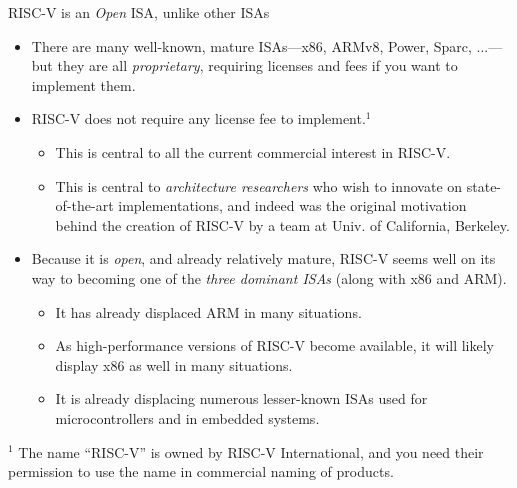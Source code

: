 \documentclass{article}
\begin{document}
\begin{center}
  {\Huge RISC-V is an \emph{Open} ISA, unlike other ISAs}

  \vspace{0.5in}

  \begin{minipage}{9in}\LARGE
    \begin{itemize}

    \item There are many well-known, mature ISAs---x86, ARMv8,
      Power, Sparc, ...---but they are all \emph{proprietary},
      requiring licenses and fees if you want to implement them.

    \item RISC-V does not require any license fee to
      implement.$^1$

      \begin{itemize}
      \item This is central to all the current commercial interest in RISC-V.
      \item This is central to \emph{architecture researchers} who
        wish to innovate on state-of-the-art implementations, and
        indeed was the original motivation behind the creation of
        RISC-V by a team at Univ. of California, Berkeley.
      \end{itemize}

    \item Because it is \emph{open}, and already relatively
      mature, RISC-V seems well on its way to becoming one of the
      \emph{three dominant ISAs} (along with x86 and ARM).
      \begin{itemize}
      \item It has already displaced ARM in many situations.
      \item As high-performance versions of RISC-V become available,
        it will likely display x86 as well in many situations.
      \item It is already displacing numerous lesser-known ISAs used
        for microcontrollers and in embedded systems.
      \end{itemize}

    \end{itemize}
  \end{minipage}

\vfill

{$^1$ The name ``RISC-V'' is owned by RISC-V International, and you
  need their permission to use the name in commercial naming of
  products.}
\end{center}
\end{document}
